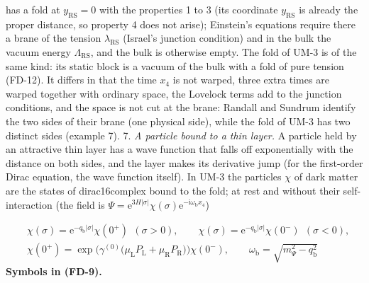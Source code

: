 \documentclass[
  10pt,
]{article}
\begin{document}
has a fold at \(y_{\mathrm{RS}} = 0\) with the properties 1 to 3 (its
coordinate \(y_{\mathrm{RS}}\) is already the proper distance, so
property 4 does not arise); Einstein's equations require there a brane
of the tension \(\lambda_{\mathrm{RS}}\) (Israel's junction condition)
and in the bulk the vacuum energy \(\Lambda_{\mathrm{RS}}\), and the
bulk is otherwise empty. The fold of UM-3 is of the same kind: its
static block is a vacuum of the bulk with a fold of pure tension
(FD-12). It differs in that the time \(x_4\) is not warped, three extra
times are warped together with ordinary space, the Lovelock terms add to
the junction conditions, and the space is not cut at the brane: Randall
and Sundrum identify the two sides of their brane (one physical side),
while the fold of UM-3 has two distinct sides (example 7). 7. \emph{A
particle bound to a thin layer.} A particle held by an attractive thin
layer has a wave function that falls off exponentially with the distance
on both sides, and the layer makes its derivative jump (for the
first-order Dirac equation, the wave function itself). In UM-3 the
particles \(\chi\) of dark matter are the states of dirac16complex bound
to the fold; at rest and without their self-interaction (the field is
\(\Psi = \mathrm{e}^{3H\lvert\sigma\rvert}\chi(\sigma)\mathrm{e}^{-\mathrm{i}\omega_{\mathrm{b}}x_4}\))

\[
\begin{aligned}
&\chi(\sigma) = \mathrm{e}^{-q_{\mathrm{b}}\lvert\sigma\rvert}\chi(0^+)\ \ (\sigma > 0),\qquad
\chi(\sigma) = \mathrm{e}^{-q_{\mathrm{b}}\lvert\sigma\rvert}\chi(0^-)\ \ (\sigma < 0),\\
&\chi(0^+) = \exp\Big(\gamma^{(0)}\big(\mu_{\mathrm{L}}P_{\mathrm{L}} + \mu_{\mathrm{R}}P_{\mathrm{R}}\big)\Big)\chi(0^-),\qquad
\omega_{\mathrm{b}} = \sqrt{m_\Psi^2 - q_{\mathrm{b}}^2}
\end{aligned} \tag{FD-9}
\] \textbf{Symbols in (FD-9).}
\end{document}
